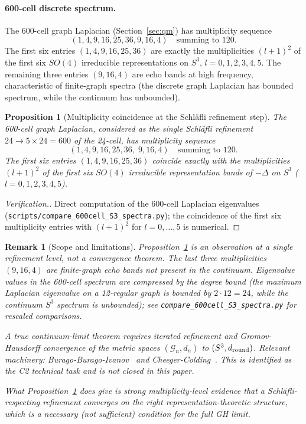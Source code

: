 \documentclass[12pt]{article}
\newtheorem{proposition}[theorem]{Proposition}
\newtheorem{remark}[theorem]{Remark}
\newcommand{\Gcal}{\mathcal{G}}
\begin{document}
\paragraph{600-cell discrete spectrum.} The 600-cell graph Laplacian (Section~\ref{sec:qm}) has multiplicity sequence
\begin{equation}\label{eq:600cell-mults}
(1, 4, 9, 16, 25, 36, 9, 16, 4) \quad \text{summing to } 120.
\end{equation}
The first six entries $(1, 4, 9, 16, 25, 36)$ are exactly the multiplicities $(l+1)^2$ of the first six $SO(4)$ irreducible representations on $S^3$, $l = 0, 1, 2, 3, 4, 5$. The remaining three entries $(9, 16, 4)$ are echo bands at high frequency, characteristic of finite-graph spectra (the discrete graph Laplacian has bounded spectrum, while the continuum has unbounded).

\begin{proposition}[Multiplicity coincidence at the Schl\"afli refinement step]\label{thm:mult-limit}
The 600-cell graph Laplacian, considered as the single Schl\"afli refinement $24 \to 5 \times 24 = 600$ of the 24-cell, has multiplicity sequence
\[
(1, 4, 9, 16, 25, 36, \; 9, 16, 4) \quad \text{summing to } 120.
\]
The \emph{first six entries} $(1, 4, 9, 16, 25, 36)$ coincide exactly with the multiplicities $(l+1)^2$ of the first six $SO(4)$ irreducible representation bands of $-\Delta$ on $S^3$ ($l = 0, 1, 2, 3, 4, 5$).
\end{proposition}

\begin{proof}[Verification.]
Direct computation of the 600-cell Laplacian eigenvalues (\texttt{scripts/compare\_600cell\_S3\_spectra.py}); the coincidence of the first six multiplicity entries with $(l+1)^2$ for $l = 0, \ldots, 5$ is numerical.
\end{proof}

\begin{remark}[Scope and limitations]\label{rmk:mult-limit-scope}
Proposition~\ref{thm:mult-limit} is an observation at a \emph{single refinement level}, not a convergence theorem. The last three multiplicities $(9, 16, 4)$ are finite-graph echo bands not present in the continuum. Eigenvalue \emph{values} in the 600-cell spectrum are compressed by the degree bound (the maximum Laplacian eigenvalue on a 12-regular graph is bounded by $2 \cdot 12 = 24$, while the continuum $S^3$ spectrum is unbounded); see \texttt{compare\_600cell\_S3\_spectra.py} for rescaled comparisons.

A true continuum-limit theorem requires \emph{iterated} refinement and Gromov-Hausdorff convergence of the metric spaces $(\Gcal_n, d_n)$ to $(S^3, d_{\rm round})$. Relevant machinery: Burago-Burago-Ivanov~\citep{BBI2001} and Cheeger-Colding~\citep{CheegerColding1997}. This is identified as the C2 technical task and is not closed in this paper.

What Proposition~\ref{thm:mult-limit} does give is strong multiplicity-level evidence that a Schl\"afli-respecting refinement converges on the right representation-theoretic structure, which is a necessary (not sufficient) condition for the full GH limit.
\end{remark}
\end{document}
